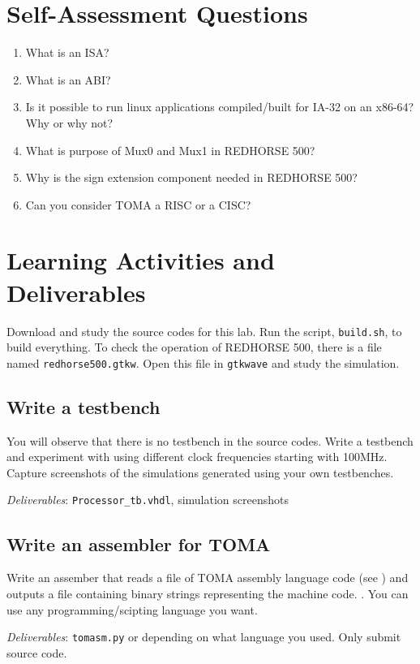 \documentclass[a4paper, 11pt,oneside]{article}
\begin{document}
\section{Self-Assessment Questions}
\begin{enumerate}
\item What is an ISA?
\item What is an ABI?
\item Is it possible to run linux applications compiled/built for IA-32 on an 
x86-64?Why or why not?
\item What is purpose of Mux0 and Mux1 in REDHORSE 500?
\item Why is the sign extension component needed in REDHORSE 500?
\item Can you consider TOMA a RISC or a CISC?
\end{enumerate}

\section{Learning Activities and Deliverables}
Download and study the source codes for this lab. Run the script, 
\texttt{build.sh}, to build everything. 
To check the operation of REDHORSE 500, there is a  file named 
\texttt{redhorse500.gtkw}. Open this file in 
\texttt{gtkwave} and study the simulation. 

\subsection{Write a testbench}
You will observe that there is no testbench in the source codes. Write a 
testbench and experiment with using different clock frequencies starting with 
100MHz. Capture screenshots of the simulations generated using your own 
testbenches.

\textit{Deliverables}: \texttt{Processor_tb.vhdl}, simulation 
screenshots

\subsection{Write an assembler for TOMA}
Write an assember that reads a file of TOMA assembly language code (see  
) and outputs a file containing binary strings 
representing the machine code. . You can use any programming/scipting language 
you want.

\textit{Deliverables}: \texttt{tomasm.py} or depending on what 
language you used. Only submit source code.
\end{document}
